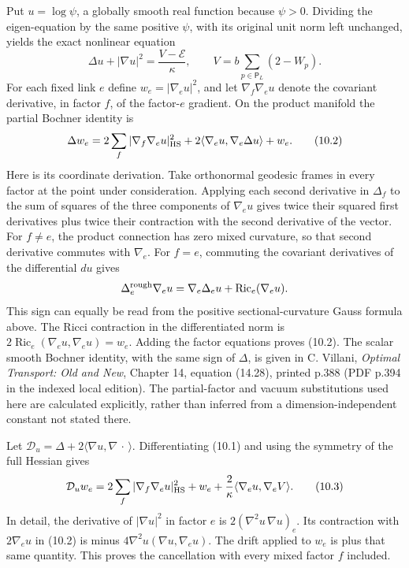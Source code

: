 \documentclass[
]{article}
\begin{document}
Put \(u=\log\psi\), a globally smooth real function because \(\psi>0\).
Dividing the eigen-equation by the same positive \(\psi\), with its
original unit norm left unchanged, yields the exact nonlinear equation
\[
\Delta u+|\nabla u|^2=\frac{V-\mathcal E}{\kappa},
\qquad V=b\sum_{p\in\mathsf P_L}(2-W_p).                         \tag{10.1}
\] For each fixed link \(e\) define \(w_e=|\nabla_eu|^2\), and let
\(\nabla_f\nabla_eu\) denote the covariant derivative, in factor \(f\),
of the factor-\(e\) gradient. On the product manifold the partial
Bochner identity is \[
\Delta w_e
=2\sum_f|\nabla_f\nabla_eu|_{\rm HS}^2
 +2\langle\nabla_eu,\nabla_e\Delta u\rangle+w_e.                  \tag{10.2}
\] Here is its coordinate derivation. Take orthonormal geodesic frames
in every factor at the point under consideration. Applying each second
derivative in \(\Delta_f\) to the sum of squares of the three components
of \(\nabla_eu\) gives twice their squared first derivatives plus twice
their contraction with the second derivative of the vector. For
\(f\ne e\), the product connection has zero mixed curvature, so that
second derivative commutes with \(\nabla_e\). For \(f=e\), commuting the
covariant derivatives of the differential \(du\) gives \[
\Delta_e^{\rm rough}\nabla_eu
=\nabla_e\Delta_eu+\operatorname{Ric}_e(\nabla_eu).
\] This sign can equally be read from the positive sectional-curvature
Gauss formula above. The Ricci contraction in the differentiated norm is
\(2\operatorname{Ric}_e(\nabla_eu,\nabla_eu)=w_e\). Adding the factor
equations proves (10.2). The scalar smooth Bochner identity, with the
same sign of \(\Delta\), is given in C. Villani, \emph{Optimal
Transport: Old and New}, Chapter 14, equation (14.28), printed p.388
(PDF p.394 in the indexed local edition). The partial-factor and vacuum
substitutions used here are calculated explicitly, rather than inferred
from a dimension-independent constant not stated there.

Let \(\mathcal D_u=\Delta+2\langle\nabla u,\nabla\,\cdot\,\rangle\).
Differentiating (10.1) and using the symmetry of the full Hessian gives
\[
\mathcal D_u w_e
=2\sum_f|\nabla_f\nabla_eu|_{\rm HS}^2+w_e
 +\frac2\kappa\langle\nabla_eu,\nabla_eV\rangle.                 \tag{10.3}
\] In detail, the derivative of \(|\nabla u|^2\) in factor \(e\) is
\(2(\nabla^2u\,\nabla u)_e\). Its contraction with \(2\nabla_eu\) in
(10.2) is minus \(4\nabla^2u(\nabla u,\nabla_eu)\). The drift applied to
\(w_e\) is plus that same quantity. This proves the cancellation with
every mixed factor \(f\) included.
\end{document}
